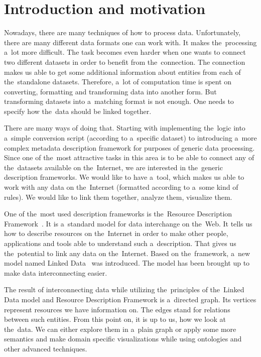 \chapter*{Introduction and motivation}
\label{ch:preface}
Nowadays, there are many techniques of how to process data. Unfortunately, there are many
different data formats one can work with. It makes the~processing a~lot more difficult.
The task becomes even harder when one wants to connect two different datasets in order to
benefit from the~connection. The connection makes us able to get some additional information
about entities from each of the~standalone datasets. Therefore, a~lot of computation time is spent
on converting, formatting and transforming data into another form. But transforming datasets
into a~matching format is not enough. One needs to specify how the~data should be linked
together.

There are many ways of doing that. Starting with implementing the~logic into a~simple conversion
script (according to a~specific dataset) to introducing a~more complex metadata description
framework for purposes of generic data processing. Since one of the~most attractive
tasks in this area is to be able to connect any of the~datasets available on the~Internet,
we are interested in the~generic description frameworks. We would like to have 
a~tool, 
which makes us able to work with any data on the~Internet (formatted according to a~some
kind of rules). We would like to link them together, analyze them, visualize 
them.

One of the~most used description frameworks is the~Resource Description Framework~\cite{rdf}.
It is a~standard model for data interchange on the~Web. It tells us how to describe
resources on the~Internet in order to make other people, applications and tools
able to understand such a~description. That gives us the~potential to link any data on the~Internet.
Based on the~framework, a~new model named Linked Data~\cite{ld} was introduced. The model
has been brought up to make data interconnecting easier.

The result of interconnecting data while utilizing the~principles of the~Linked Data model
and Resource Description Framework is a~directed graph. Its vertices represent resources we
have information on. The edges stand for relations between such entities. From this point on,
it is up to us, how we look at the~data. We can either explore them in a~plain graph or apply
some more semantics and make domain specific visualizations while using ontologies
and other advanced techniques.

